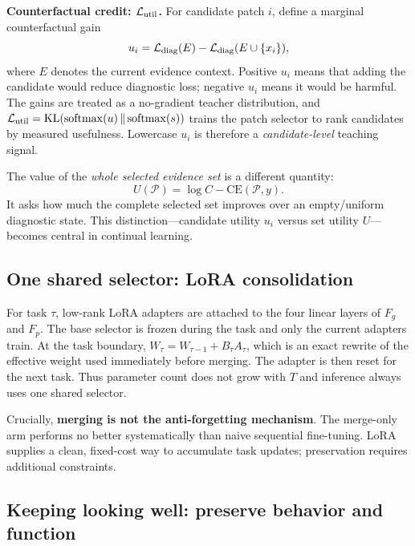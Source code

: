 \documentclass{article}
\def\L{{\cal L}}
\newcommand{\Fg}{F_g}
\newcommand{\Fp}{F_p}
\newcommand{\Psel}{\mathcal{P}}
\begin{document}
\textbf{Counterfactual credit: $\L_{\mathrm{util}}$.}
For candidate patch $i$, define a marginal counterfactual gain
\begin{equation}
u_i
=
\L_{\mathrm{diag}}(E)
-
\L_{\mathrm{diag}}(E\cup\{x_i\}),
\label{eq:ui}
\end{equation}
where $E$ denotes the current evidence context.
Positive $u_i$ means that adding the candidate would reduce diagnostic loss; negative $u_i$ means it would be harmful.
The gains are treated as a no-gradient teacher distribution, and $\L_{\mathrm{util}}=\mathrm{KL}(\mathrm{softmax}(u)\,\Vert\,\mathrm{softmax}(s))$ trains the patch selector to rank candidates by measured usefulness.
Lowercase $u_i$ is therefore a \emph{candidate-level} teaching signal.

The value of the \emph{whole selected evidence set} is a different quantity:
\begin{equation}
U(\Psel)
=
\log C-\mathrm{CE}(\Psel,y).
\label{eq:bigU}
\end{equation}
It asks how much the complete selected set improves over an empty/uniform diagnostic state.
This distinction---candidate utility $u_i$ versus set utility $U$---becomes central in continual learning.


\subsection{One shared selector: LoRA consolidation}
\label{ssec:lora}

For task $\tau$, low-rank LoRA adapters are attached to the four linear layers of $\Fg$ and $\Fp$.
The base selector is frozen during the task and only the current adapters train.
At the task boundary, $W_{\tau}=W_{\tau-1}+B_\tau A_\tau$, which is an exact rewrite of the effective weight used immediately before merging.
The adapter is then reset for the next task.
Thus parameter count does not grow with $T$ and inference always uses one shared selector.

Crucially, \textbf{merging is not the anti-forgetting mechanism}.
The merge-only arm performs no better systematically than naive sequential fine-tuning.
LoRA supplies a clean, fixed-cost way to accumulate task updates; preservation requires additional constraints.

\subsection{Keeping looking well: preserve behavior and function}
\label{ssec:cl}
\end{document}
